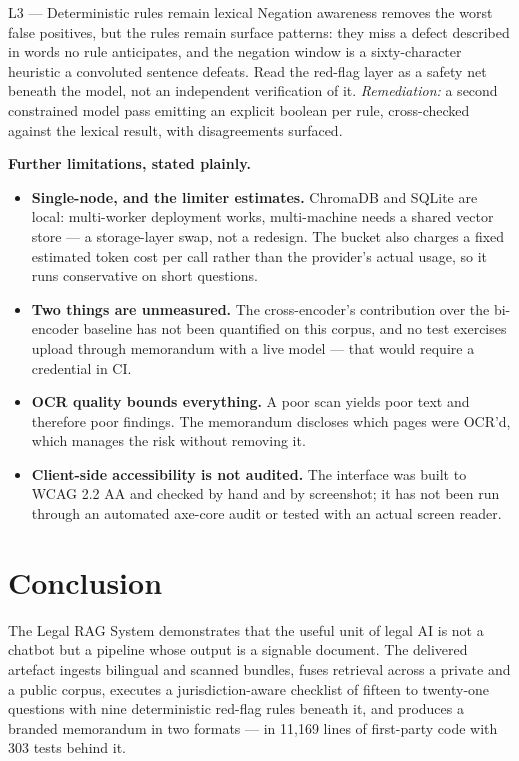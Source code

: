 \documentclass[11pt,a4paper]{article}
\begin{document}
\begin{riskbox}{L3 --- Deterministic rules remain lexical}
\small
Negation awareness removes the worst false positives, but the rules remain surface
patterns: they miss a defect described in words no rule anticipates, and the negation window
is a sixty-character heuristic a convoluted sentence defeats. Read the red-flag layer as a
safety net beneath the model, not an independent verification of it.
\emph{Remediation:} a second constrained model pass emitting an explicit boolean per rule,
cross-checked against the lexical result, with disagreements surfaced.
\end{riskbox}

\begin{quietbox}
\small\textbf{Further limitations, stated plainly.}
\begin{itemize}
\item \textbf{Single-node, and the limiter estimates.} ChromaDB and SQLite are local:
multi-worker deployment works, multi-machine needs a shared vector store --- a storage-layer
swap, not a redesign. The bucket also charges a fixed estimated token cost per call rather
than the provider's actual usage, so it runs conservative on short questions.
\item \textbf{Two things are unmeasured.} The cross-encoder's contribution over the
bi-encoder baseline has not been quantified on this corpus, and no test exercises upload
through memorandum with a live model --- that would require a credential in CI.
\item \textbf{OCR quality bounds everything.} A poor scan yields poor text and therefore
poor findings. The memorandum discloses which pages were OCR'd, which manages the risk
without removing it.
\item \textbf{Client-side accessibility is not audited.} The interface was built to WCAG
2.2 AA and checked by hand and by screenshot; it has not been run through an automated
axe-core audit or tested with an actual screen reader.
\end{itemize}
\end{quietbox}

\section{Conclusion}

The Legal RAG System demonstrates that the useful unit of legal AI is not a chatbot but a
pipeline whose output is a signable document. The delivered artefact ingests bilingual and
scanned bundles, fuses retrieval across a private and a public corpus, executes a
jurisdiction-aware checklist of fifteen to twenty-one questions with nine deterministic
red-flag rules beneath it, and produces a branded memorandum in two formats --- in 11{,}169
lines of first-party code with 303 tests behind it.
\end{document}
